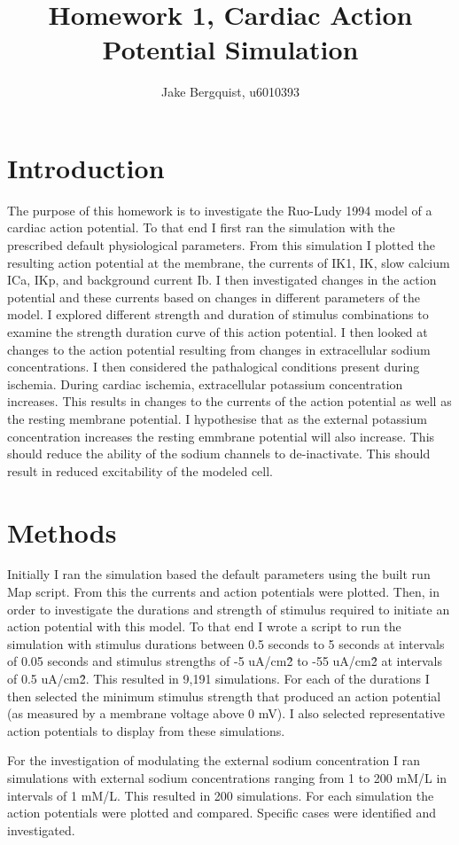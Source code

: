 \documentclass[12pt]{article}
\begin{document}
\title{Homework 1, Cardiac Action Potential Simulation}
\author{Jake Bergquist, u6010393}
\maketitle
\tableofcontents
\newpage

\section{Introduction}
\par{}
The purpose of this homework is to investigate the Ruo-Ludy 1994 model of a cardiac action potential. To that end I first ran the simulation with the prescribed default physiological parameters. From this simulation I plotted the resulting action potential at the membrane, the currents of IK1, IK, slow calcium ICa, IKp, and background current Ib. I then investigated changes in the action potential and these currents based on changes in different parameters of the model. I explored different strength and duration of stimulus combinations to examine the strength duration curve of this action potential. I then looked at changes to the action potential resulting from changes in extracellular sodium concentrations. I then considered the pathalogical conditions present during ischemia. During cardiac ischemia, extracellular potassium concentration increases. This results in changes to the currents of the action potential as well as the resting membrane potential. I hypothesise that as the external potassium concentration increases the resting emmbrane potential will also increase. This should reduce the ability of the sodium channels to de-inactivate. This should result in reduced excitability of the modeled cell. 

\section{Methods}
\par{}
Initially I ran the simulation based the default parameters using the built run Map script. From this the currents and action potentials were plotted. Then, in order to investigate the durations and strength of stimulus required to initiate an action potential with this model. To that end I wrote a script to run the simulation with stimulus durations between 0.5 seconds to 5 seconds at intervals of 0.05 seconds and stimulus strengths of -5 uA/cm\^2 to -55 uA/cm\^2 at intervals of 0.5 uA/cm\^2. This resulted in 9,191 simulations. For each of the durations I then selected the minimum stimulus strength that produced an action potential (as measured by a membrane voltage above 0 mV). I also selected representative action potentials to display from these simulations.
\par{}
For the investigation of modulating the external sodium concentration I ran simulations with external sodium concentrations ranging from 1 to 200 mM/L in intervals of 1 mM/L. This resulted in 200 simulations. For each simulation the action potentials were plotted and compared. Specific cases were identified and investigated.
\end{document}
